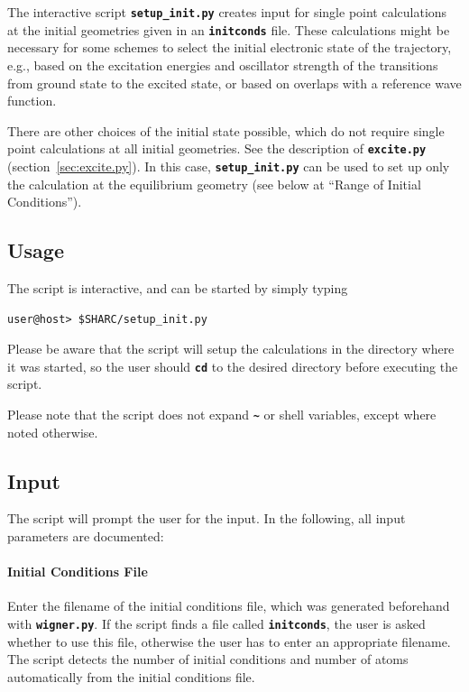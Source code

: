 \documentclass[a4paper,10pt,DIV=15,openany]{scrbook}
\newcommand{\ttt}[1]{\textbf{\texttt{#1}}}
\begin{document}
The interactive script \ttt{setup\_init.py} creates input for single point calculations at the initial geometries given in an \ttt{initconds} file. These calculations might be necessary for some schemes to select the initial electronic state of the trajectory, e.g., based on the excitation energies and oscillator strength of the transitions from ground state to the excited state, or based on overlaps with a reference wave function. 

There are other choices of the initial state possible, which do not require single point calculations at all initial geometries. See the description of \ttt{excite.py} (section~\ref{sec:excite.py}). In this case, \ttt{setup\_init.py} can be used to set up only the calculation at the equilibrium geometry (see below at ``Range of Initial Conditions'').

\subsection{Usage}

The script is interactive, and can be started by simply typing 
\begin{verbatim}
user@host> $SHARC/setup_init.py
\end{verbatim}
Please be aware that the script will setup the calculations in the directory where it was started, so the user should \ttt{cd} to the desired directory before executing the script.

Please note that the script does not expand \ttt{\textasciitilde} or shell variables, except where noted otherwise.

\subsection{Input}

The script will prompt the user for the input. In the following, all input parameters are documented:

\paragraph{Initial Conditions File}

Enter the filename of the initial conditions file, which was generated beforehand with \ttt{wigner.py}. If the script finds a file called \ttt{initconds}, the user is asked whether to use this file, otherwise the user has to enter an appropriate filename. The script detects the number of initial conditions and number of atoms automatically from the initial conditions file.
\end{document}
